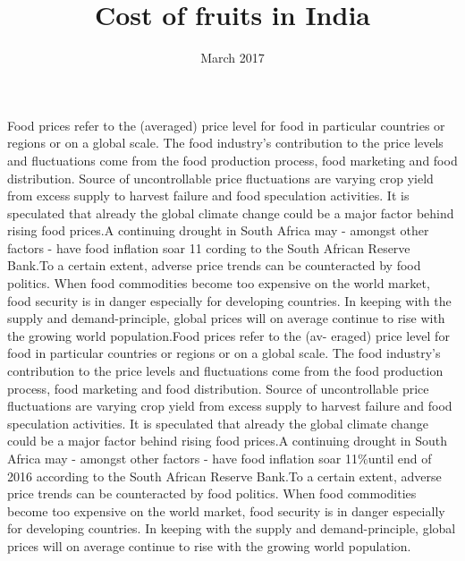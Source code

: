 \documentclass{article}
\begin{document}
	\title{Cost of fruits in India}
	\date{March 2017}
	\maketitle
	Food prices refer to the (averaged) price level for food in particular countries or regions or on a
	global scale. The food industry’s contribution to the price levels and fluctuations come from the food
	production process, food marketing and food distribution. Source of uncontrollable price fluctuations are
	varying crop yield from excess supply to harvest failure and food speculation activities. It is speculated
	that already the global climate change could be a major factor behind rising food prices.A continuing
	drought in South Africa may - amongst other factors - have food inflation soar 11%
	cording to the South African Reserve Bank.To a certain extent, adverse price trends can be counteracted
	by food politics. When food commodities become too expensive on the world market, food security is
	in danger especially for developing countries. In keeping with the supply and demand-principle, global
	prices will on average continue to rise with the growing world population.Food prices refer to the (av-
	eraged) price level for food in particular countries or regions or on a global scale. The food industry’s
	contribution to the price levels and fluctuations come from the food production process, food marketing
	and food distribution. Source of uncontrollable price fluctuations are varying crop yield from excess
	supply to harvest failure and food speculation activities. It is speculated that already the global climate
	change could be a major factor behind rising food prices.A continuing drought in South Africa may -
	amongst other factors - have food inflation soar 11\%until end of 2016 according to the South African
	Reserve Bank.To a certain extent, adverse price trends can be counteracted by food politics. When
	food commodities become too expensive on the world market, food security is in danger especially for
	developing countries. In keeping with the supply and demand-principle, global prices will on average
	continue to rise with the growing world population.\\
\end{document}
